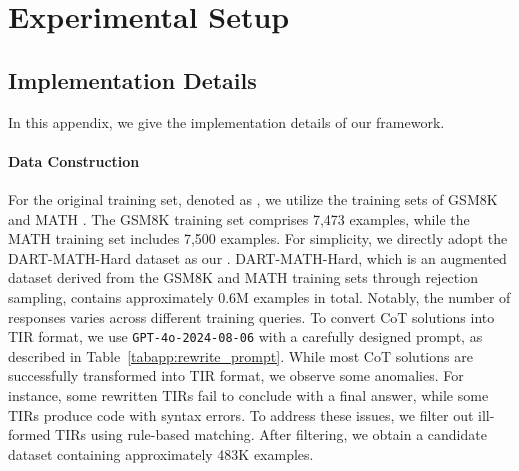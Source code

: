 \section{Experimental Setup}\label{app:exp_setup}

\subsection{{\method} Implementation Details}\label{app:method_details}
In this appendix, we give the implementation details of our {\method} framework.

\paragraph{Data Construction}
For the original training set, denoted as {\dorige}, we utilize the training sets of GSM8K \citep{gsm8k2021cobbe} and MATH \citep{MATH2021hendrycks}. 
The GSM8K training set comprises 7,473 examples, while the MATH training set includes 7,500 examples. 
For simplicity, we directly adopt the DART-MATH-Hard dataset \citep{dartmath2024tong} as our {\daug}. 
DART-MATH-Hard, which is an augmented dataset derived from the GSM8K and MATH training sets through rejection sampling, contains approximately 0.6M examples in total. 
Notably, the number of responses varies across different training queries.
To convert CoT solutions into TIR format, we use \texttt{GPT-4o-2024-08-06} with a carefully designed prompt, as described in Table~\ref{tabapp:rewrite_prompt}. 
While most CoT solutions are successfully transformed into TIR format, we observe some anomalies. 
For instance, some rewritten TIRs fail to conclude with a final answer, while some TIRs produce code with syntax errors. 
To address these issues, we filter out ill-formed TIRs using rule-based matching. 
After filtering, we obtain a candidate dataset containing approximately 483K examples.


